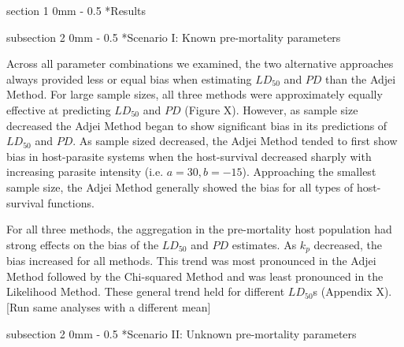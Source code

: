 \documentclass[12pt, a4paper]{article}
\makeatletter
\renewcommand{\section}{\@startsection
{section}%
{1}%
{0mm}%
{-\baselineskip}%
{0.5\baselineskip}%
{\normalfont\bf\large}} %
\renewcommand{\subsection}{\@startsection
{subsection}%
{2}%
{0mm}%
{-\baselineskip}%
{0.5\baselineskip}%
{\normalfont\bf}} %
\makeatother
\begin{document}

\section*{Results}

\subsection*{Scenario I: Known pre-mortality parameters}

Across all parameter combinations we examined, the two alternative approaches always provided less or equal bias when estimating $LD_{50}$ and $PD$ than the Adjei Method.  For large sample sizes, all three methods were approximately equally effective at predicting $LD_{50}$ and $PD$ (Figure X).  However, as sample size decreased the Adjei Method began to show significant bias in its predictions of $LD_{50}$ and $PD$.  As sample sized decreased, the Adjei Method tended to first show bias in host-parasite systems when the host-survival decreased sharply with increasing parasite intensity (i.e. $a = 30, b = -15$).  Approaching the smallest sample size, the Adjei Method generally showed the bias for all types of host-survival functions.

For all three methods, the aggregation in the pre-mortality host population had strong effects on the bias of the $LD_{50}$ and $PD$ estimates.  As $k_p$ decreased, the bias increased for all methods.  This trend was most pronounced in the Adjei Method followed by the Chi-squared Method and was least pronounced in the Likelihood Method.  These general trend held for different $LD_{50}$s (Appendix X). [Run same analyses with a different mean]


\subsection*{Scenario II: Unknown pre-mortality parameters}
\end{document}
